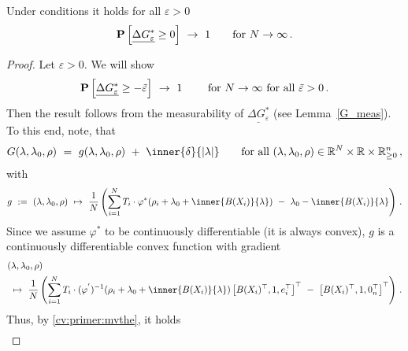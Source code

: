 \begin{lemma}
   \label{bw:cd:lem2}
   Under conditions it holds
   for all $\varepsilon>0$
\begin{gather}
   \P
   \left[ 
     \underline{
     \Delta G^*
     _\varepsilon
     }
     \ge 
     0
   \right]
   \ 
   \to
   \ 
   1
   \qquad
   \text{for}
   \ 
   N\to\infty
   \,.
\end{gather}
 \end{lemma}
 \begin{proof}
   Let $\varepsilon>0$.
   We will show
\begin{gather}
   \P
   \left[ 
     \underline{
     \Delta G^*
     _\varepsilon
     }
     \ge 
     -\tilde{\varepsilon}
   \right]
   \ 
   \to
   \ 
   1
   \qquad
   \ 
   \text{for}
   \ 
   N\to\infty
   \ 
   \text{for all}\ 
   \tilde{\varepsilon}>0
   \,.
\end{gather}
Then the result follows from the measurability of 
$
     \underline{
     \Delta G^*
     _\varepsilon
     }
$
(see Lemma~\ref{G_meas}).
To this end, note, that
\begin{gather*}
  G(\lambda,\lambda_0,\rho)
  \ 
  =
  \ 
  g(\lambda,\lambda_0,\rho)
  \ 
  +
  \ 
  \inner{\delta}{|\lambda|}
  \qquad
  \text{for all}\ 
  (\lambda,\lambda_0,\rho)
  \in
  \R^{N}
  \times
  \R
  \times
  \R^n_{\ge 0}
  \,,
\end{gather*}
with
\begin{gather*}
  g
  \ 
  :=
  \ 
  (\lambda,\lambda_0,\rho)
  \ 
  \mapsto
  \ 
     \frac{1}{N}
     \left( 
\sum_{i=1} 
  ^N
  T_i
  \cdot
  \varphi^*
  \!
  \left( 
    \rho_i
    +
\lambda_0
+
\inner
{B(X_i)}
{
\lambda
}
  \right)
  \ 
  -
\ 
\lambda_0
-
\inner
{B(X_i)}
{
\lambda
}
     \right)
  \,.
\end{gather*}
Since we assume $\varphi^*$ to be continuously differentiable (it is always convex),
$g$ is a continuously differentiable convex function with gradient
\begin{align*}
  &
  (\lambda,\lambda_0,\rho)
  \\
  &
  \ 
  \mapsto
  \ 
     \frac{1}{N}
     \left( 
\sum_{i=1} 
  ^N
  T_i
  \cdot
  (
  \varphi^{'}
  )
  ^{-1}
  \!
  \left( 
    \rho_i
    +
\lambda_0
+
\inner
{B(X_i)}
{
\lambda
}
  \right)
  \left[ 
    B(X_i)^\top,1,e_i^\top
  \right]^\top
  \ 
  -
  \ 
  \left[ 
    B(X_i)^\top,1,0_n^\top
  \right]^\top
     \right)
  \,.
\end{align*}
Thus, by \eqref{cv:primer:mvthe},
it holds
\begin{align*}

\end{align*}
\end{proof}
